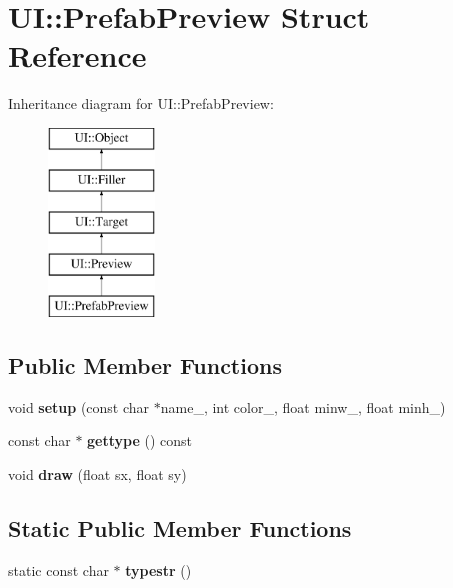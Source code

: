 \hypertarget{struct_u_i_1_1_prefab_preview}{}\section{UI\+:\+:Prefab\+Preview Struct Reference}
\label{struct_u_i_1_1_prefab_preview}
Inheritance diagram for UI\+:\+:Prefab\+Preview\+:\begin{figure}[H]
\begin{center}
\leavevmode
\includegraphics[height=5.000000cm]{struct_u_i_1_1_prefab_preview}
\end{center}
\end{figure}
\subsection*{Public Member Functions}
\begin{DoxyCompactItemize}
\item 
\mbox{\label{struct_u_i_1_1_prefab_preview_a34f97881da632705473d2661b9180888}} 
void {\bfseries setup} (const char $\ast$name\+\_\+, int color\+\_\+, float minw\+\_\+, float minh\+\_\+)
\item 
\mbox{\label{struct_u_i_1_1_prefab_preview_ae7822bd693e21d1fc8060d0478d99609}} 
const char $\ast$ {\bfseries gettype} () const
\item 
\mbox{\label{struct_u_i_1_1_prefab_preview_aeecf992901048ff0dac03970b0827e61}} 
void {\bfseries draw} (float sx, float sy)
\end{DoxyCompactItemize}
\subsection*{Static Public Member Functions}
\begin{DoxyCompactItemize}
\item 
\mbox{\label{struct_u_i_1_1_prefab_preview_ac53782370571e3539866eab6c5659502}} 
static const char $\ast$ {\bfseries typestr} ()
\end{DoxyCompactItemize}
